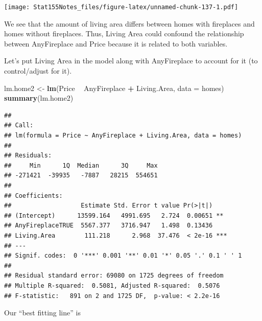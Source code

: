 \documentclass[]{book}
\newenvironment{Shaded}{\begin{snugshade}}{\end{snugshade}}
\newcommand{\DataTypeTok}[1]{\textcolor[rgb]{0.13,0.29,0.53}{#1}}
\newcommand{\KeywordTok}[1]{\textcolor[rgb]{0.13,0.29,0.53}{\textbf{#1}}}
\newcommand{\NormalTok}[1]{#1}
\newcommand{\OperatorTok}[1]{\textcolor[rgb]{0.81,0.36,0.00}{\textbf{#1}}}
\newcommand{\StringTok}[1]{\textcolor[rgb]{0.31,0.60,0.02}{#1}}
\begin{document}
\begin{Shaded}
\end{Shaded}

\texttt{[image: Stat155Notes\_files/figure-latex/unnamed-chunk-137-1.pdf]}

We see that the amount of living area differs between homes with fireplaces and homes without fireplaces. Thus, Living Area could confound the relationship between AnyFireplace and Price because it is related to both variables.

Let's put Living Area in the model along with AnyFireplace to account for it (to control/adjust for it).

\begin{Shaded}
\begin{Highlighting}[]
\NormalTok{lm.home2 <-}\StringTok{ }\KeywordTok{lm}\NormalTok{(Price }\OperatorTok{~}\StringTok{ }\NormalTok{AnyFireplace }\OperatorTok{+}\StringTok{ }\NormalTok{Living.Area, }\DataTypeTok{data =}\NormalTok{ homes)}
\KeywordTok{summary}\NormalTok{(lm.home2)}
\end{Highlighting}
\end{Shaded}

\begin{verbatim}
## 
## Call:
## lm(formula = Price ~ AnyFireplace + Living.Area, data = homes)
## 
## Residuals:
##     Min      1Q  Median      3Q     Max 
## -271421  -39935   -7887   28215  554651 
## 
## Coefficients:
##                   Estimate Std. Error t value Pr(>|t|)    
## (Intercept)      13599.164   4991.695   2.724  0.00651 ** 
## AnyFireplaceTRUE  5567.377   3716.947   1.498  0.13436    
## Living.Area        111.218      2.968  37.476  < 2e-16 ***
## ---
## Signif. codes:  0 '***' 0.001 '**' 0.01 '*' 0.05 '.' 0.1 ' ' 1
## 
## Residual standard error: 69080 on 1725 degrees of freedom
## Multiple R-squared:  0.5081, Adjusted R-squared:  0.5076 
## F-statistic:   891 on 2 and 1725 DF,  p-value: < 2.2e-16
\end{verbatim}

Our ``best fitting line'' is
\end{document}
